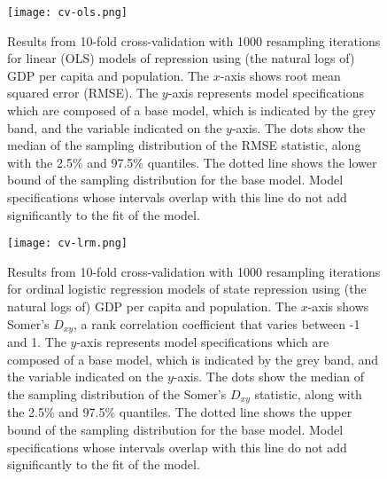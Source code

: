 \documentclass[12pt]{article}
\begin{document}
\begin{figure}[!htpb]
\centering
\texttt{[image: cv-ols.png]}
\caption{Results from 10-fold cross-validation with 1000 resampling iterations for linear (OLS) models of repression using (the natural logs of) GDP per capita and population. The $x$-axis shows root mean squared error (RMSE). The $y$-axis represents model specifications which are composed of a base model, which is indicated by the grey band, and the variable indicated on the $y$-axis. The dots show the median of the sampling distribution of the RMSE statistic, along with the 2.5\% and 97.5\% quantiles. The dotted line shows the lower bound of the sampling distribution for the base model. Model specifications whose intervals overlap with this line do not add significantly to the fit of the model.}
\label{fig:cv-ols}
\end{figure}

\begin{figure}[!htpb]
\centering
\texttt{[image: cv-lrm.png]}
\caption{Results from 10-fold cross-validation with 1000 resampling iterations for ordinal logistic regression models of state repression using (the natural logs of) GDP per capita and population. The $x$-axis shows Somer's $D_{xy}$, a rank correlation coefficient that varies between -1 and 1. The $y$-axis represents model specifications which are composed of a base model, which is indicated by the grey band, and the variable indicated on the $y$-axis. The dots show the median of the sampling distribution of the Somer's $D_{xy}$ statistic, along with the 2.5\% and 97.5\% quantiles. The dotted line shows the upper bound of the sampling distribution for the base model. Model specifications whose intervals overlap with this line do not add significantly to the fit of the model.}
\label{fig:cv-lrm}
\end{figure}
\end{document}
